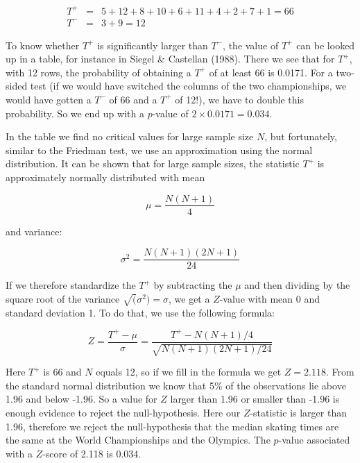 \documentclass[]{book}\usepackage[]{graphicx}\usepackage[]{color}
\begin{document}
\begin{eqnarray}
T^+ &=& 5+ 12 + 8 +10+6+11+4 +2 +7 +1 = 66 \nonumber \\
T^- &=& 3 + 9= 12 \nonumber
\end{eqnarray}



To know whether $T^+$ is significantly larger than $T^-$, the value of $T^+$ can be looked up in a table, for instance in Siegel \& Castellan (1988). There we see that for $T^+$, with 12 rows, the probability of obtaining a $T^+$ of at least 66 is 0.0171. For a two-sided test (if we would have switched the columns of the two championships, we would have gotten a $T^-$ of 66 and a $T^+$ of 12!), we have to double this probability. So we end up with a $p$-value of $2 \times 0.0171=0.034$.


In the table we find no critical values for large sample size $N$, but fortunately, similar to the Friedman test, we use an approximation using the normal distribution. It can be shown that for large sample sizes, the statistic $T^+$ is approximately normally distributed with mean


\begin{equation}
\mu = \frac{N(N+1)}{4}
\end{equation}

and variance:

\begin{equation}
\sigma^2= \frac {N(N+1)(2N+1)  }  {24}
\end{equation}


If we therefore standardize the $T^+$ by subtracting the $\mu$ and then dividing by the square root of the variance $\sqrt(\sigma^2)=\sigma$, we get a $Z$-value with mean 0 and standard deviation 1. To do that, we use the following formula:

\begin{equation}
Z = \frac{T^+ - \mu}{\sigma} =  \frac  { T^+ - N(N+1)/4} {\sqrt{N(N+1)(2N+1)/24}}
\end{equation}


Here $T^+$ is 66 and $N$ equals 12, so if we fill in the formula we get $Z= 2.118$. From the standard normal distribution we know that 5\% of the observations lie above 1.96 and below -1.96. So a value for $Z$ larger than 1.96 or smaller than -1.96 is enough evidence to reject the null-hypothesis. Here our $Z$-statistic is larger than 1.96, therefore we reject the null-hypothesis that the median skating times are the same at the World Championships and the Olympics. The $p$-value associated with a $Z$-score of 2.118 is 0.034.
\end{document}
